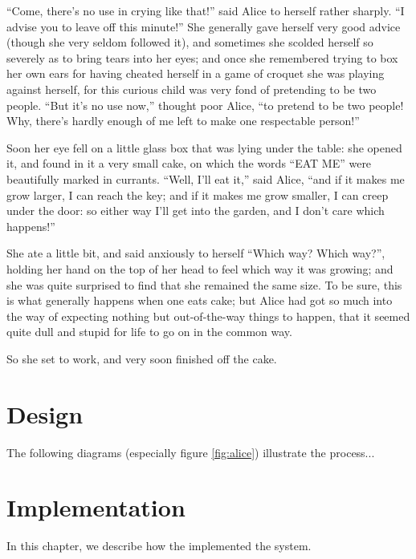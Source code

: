 \documentclass{l3proj}
\begin{document}
``Come, there's no use in crying like that!'' said Alice to herself rather
sharply. ``I advise you to leave off this minute!'' She generally gave
herself very good advice (though she very seldom followed it), and
sometimes she scolded herself so severely as to bring tears into her eyes;
and once she remembered trying to box her own ears for having cheated
herself in a game of croquet she was playing against herself, for this
curious child was very fond of pretending to be two people. ``But it's no
use now,'' thought poor Alice, ``to pretend to be two people! Why, there's
hardly enough of me left to make one respectable person!''

Soon her eye fell on a little glass box that was lying under the table: she
opened it, and found in it a very small cake, on which the words ``EAT ME''
were beautifully marked in currants. ``Well, I'll eat it,'' said Alice, ``and
if it makes me grow larger, I can reach the key; and if it makes me grow
smaller, I can creep under the door: so either way I'll get into the
garden, and I don't care which happens!''

She ate a little bit, and said anxiously to herself ``Which way? Which
way?'', holding her hand on the top of her head to feel which way it was
growing; and she was quite surprised to find that she remained the same
size. To be sure, this is what generally happens when one eats cake; but
Alice had got so much into the way of expecting nothing but out-of-the-way
things to happen, that it seemed quite dull and stupid for life to go on in
the common way.

So she set to work, and very soon finished off the cake. 

\chapter{Design}
\label{design}

The following diagrams (especially figure \ref{fig:alice}) illustrate the
process...

\chapter{Implementation}
\label{impl}

In this chapter, we describe how the implemented the system.

\end{document}
